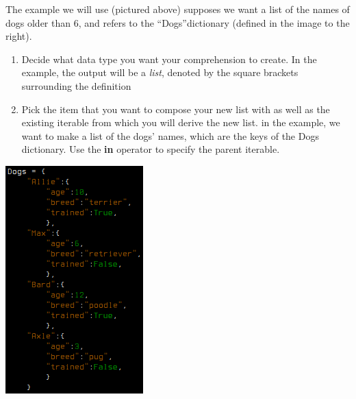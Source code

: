 \documentclass[11pt]{article}
\begin{document}
\noindent
\begin{minipage}[h]{.67\textwidth}
	The example we will use (pictured above) supposes we want a list of the names of dogs older than 6, and refers to the ``Dogs''dictionary (defined in the image to the right).
	\begin{enumerate}
		\item{Decide what data type you want your comprehension to create. In the example, the output will be a \emph{list}, denoted by the square brackets surrounding the definition}
		\item{Pick the item that you want to compose your new list with as well as the existing iterable from which you will derive the new list. in the example, we want to make a list of the dogs' names, which are the keys of the Dogs dictionary. Use the \textbf{in} operator to specify the parent iterable.}
		\setcounter{enumTemp}{\theenumi}
	\end{enumerate}
\end{minipage}
\begin{minipage}[h]{.33\textwidth}
	\hfill
	\includegraphics[width=.8\linewidth]{./figures/dict.png}
	\label{dict} %
\end{minipage}
\end{document}
